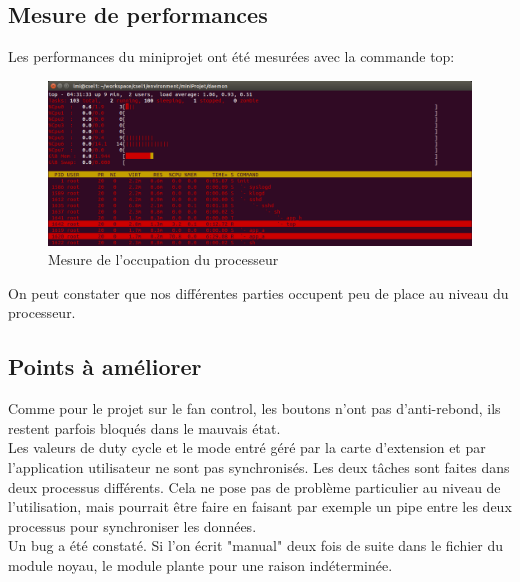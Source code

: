 \subsection{Mesure de performances}
Les performances du miniprojet ont été mesurées avec la commande top:
\begin{figure}[H]
	\begin{center}
		\includegraphics[width=16.5cm]{img/top3.png}
		\caption{Mesure de l'occupation du processeur}
		\label{top3}
	\end{center}
\end{figure}
On peut constater que nos différentes parties occupent peu de place au niveau du processeur.

\subsection{Points à améliorer}
Comme pour le projet sur le fan control, les boutons n'ont pas d'anti-rebond, ils restent parfois bloqués dans le mauvais état.\\
Les valeurs de duty cycle et le mode entré géré par la carte d'extension et par l'application utilisateur ne sont pas synchronisés. Les deux tâches sont faites dans deux processus différents. Cela ne pose pas de problème particulier au niveau de l'utilisation, mais pourrait être faire en faisant par exemple un pipe entre les deux processus pour synchroniser les données.\\
Un bug a été constaté. Si l'on écrit "manual" deux fois de suite dans le fichier du module noyau, le module plante pour une raison indéterminée.